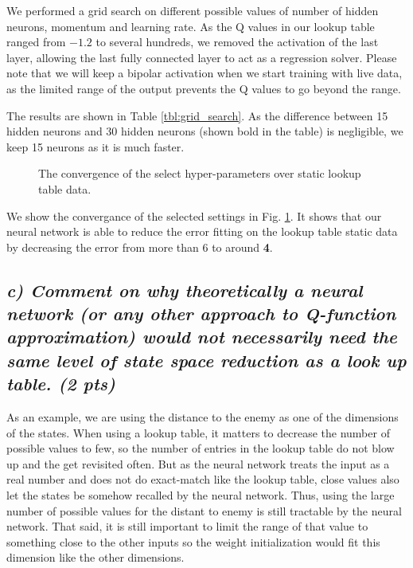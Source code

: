 \documentclass[a4paper,12pt]{article}
\begin{document}
We performed a grid search on different possible values of number of hidden neurons, momentum and learning rate. As the Q values in our lookup table ranged from $-1.2$ to several hundreds, we removed the activation of the last layer, allowing the last fully connected layer to act as a regression solver. Please note that we will keep a bipolar activation when we start training with live data, as the limited range of the output prevents the Q values to go beyond the range. 

The results are shown in Table \ref{tbl:grid_search}. As the difference between 15 hidden neurons and 30 hidden neurons (shown bold in the table) is negligible, we keep 15 neurons as it is much faster. 

\begin{figure}[hbt!]
\caption{The convergence of the select hyper-parameters over static lookup table data.}
\label{fig:static_lut}
\end{figure}

We show the convergance of the selected settings in Fig. \ref{fig:static_lut}. It shows that our neural network is able to reduce the error fitting on the lookup table static data by decreasing the error from more than 6 to around \textbf{4}. 

\pagebreak

\subsection*{\emph{c) Comment on why theoretically a neural network (or any other approach to Q-function approximation) would not necessarily need the same level of state space reduction as a look up table. (2 pts)}}
As an example, we are using the distance to the enemy as one of the dimensions of the states. When using a lookup table, it matters to decrease the number of possible values to few, so the number of entries in the lookup table do not blow up and the get revisited often. But as the neural network treats the input as a real number and does not do exact-match like the lookup table, close values also let the states be somehow recalled by the neural network. Thus, using the large number of possible values for the distant to enemy is still tractable by the neural network. That said, it is still important to limit the range of that value to something close to the other inputs so the weight initialization would fit this dimension like the other dimensions. 
\end{document}
